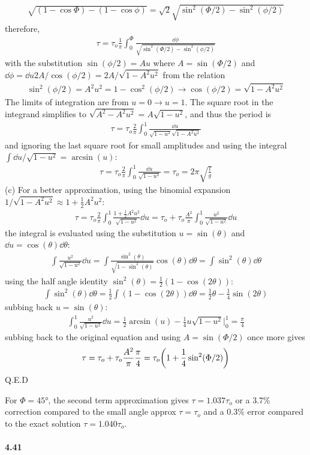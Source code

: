 \documentclass[../problems.tex]{subfiles}
\begin{document}
\begin{align*}
    \sqrt{(1-\cos\Phi) - (1-\cos\phi)} = \sqrt{2} \sqrt{\sin^2(\Phi/2) - \sin^2(\phi/2)}
\end{align*}
therefore,
\begin{align*}
    \tau = \tau_o \frac{1}{\pi} \int_0^\Phi \frac{\dd{\phi}}{\sqrt{\sin^2(\Phi/2) - \sin^2(\phi/2)}}
\end{align*}
with the substitution $\sin(\phi/2) = Au$ where $A = \sin(\Phi/2)$ and
$\dd{\phi} = \dd{u} 2A/\cos(\phi/2) = 2A/\sqrt{1-A^2 u^2}$ from the relation
\begin{align*}
    \sin^2(\phi/2) = A^2 u^2 = 1 - \cos^2(\phi/2) \to \cos(\phi/2) = \sqrt{1 - A^2 u^2}
\end{align*}
The limits of integration are from $u = 0 \to u = 1$. The square root in the integrand simplifies to
$\sqrt{A^2 - A^2u^2} = A\sqrt{1 - u^2}$, and thus the period is
\begin{align*}
    \tau = \tau_o \frac{2}{\pi} \int_0^1 \frac{\dd{u}}{\sqrt{1-u^2} \sqrt{1-A^2 u^2}}
\end{align*}
and ignoring the last square root for small amplitudes and using the integral
$\int \dd{u}/\sqrt{1-u^2} = \arcsin(u)$:
\begin{align*}
    \tau = \tau_o \frac{2}{\pi} \int_0^1 \frac{\dd{u}}{\sqrt{1-u^2}}
    = \tau_o = 2\pi \sqrt{\frac{l}{g}}
\end{align*}
(c) For a better approximation, using the binomial expansion $1/\sqrt{1-A^2 u^2} \approx
1 + \frac{1}{2} A^2 u^2$:
\begin{align*}
    \tau = \tau_o \frac{2}{\pi} \int_0^1 \frac{1 + \frac{1}{2} A^2 u^2}{\sqrt{1-u^2}} \dd{u}
    = \tau_o + \tau_o \frac{A^2}{\pi} \int_0^1 \frac{u^2}{\sqrt{1-u^2}} \dd{u}
\end{align*}
the integral is evaluated using the substitution $u = \sin(\theta)$ and $\dd{u} = \cos(\theta)
\dd{\theta}$:
\begin{align*}
    \int \frac{u^2}{\sqrt{1-u^2}} \dd{u} = \int \frac{\sin^2(\theta)}{\sqrt{1-\sin^2(\theta)}}
        \cos(\theta) \dd{\theta}
    = \int \sin^2(\theta) \dd{\theta}
\end{align*}
using the half angle identity $\sin^2(\theta) = \frac{1}{2}(1 - \cos(2\theta))$:
\begin{align*}
    \int \sin^2(\theta) \dd{\theta} = \frac{1}{2} \int (1 - \cos(2\theta)) \dd{\theta}
    = \frac{1}{2} \theta - \frac{1}{4} \sin(2\theta)
\end{align*}
subbing back $u = \sin(\theta)$:
\begin{align*}
    \int_0^1 \frac{u^2}{\sqrt{1-u^2}} \dd{u}
    = \frac{1}{2} \arcsin(u) - \frac{1}{4} u \sqrt{1-u^2} \Big|_0^1 = \frac{\pi}{4}
\end{align*}
subbing back to the original equation and using $A = \sin(\Phi/2)$ once more gives
\begin{align*}
    \tau = \tau_o + \tau_o \frac{A^2}{\pi} \frac{\pi}{4} 
    = \tau_o \quantity(1 + \frac{1}{4} \sin^2(\Phi/2))
\end{align*}
Q.E.D

For $\Phi = \ang{45}$, the second term approximation gives $\tau = 1.037\tau_o$ or a 3.7\%
correction compared to the small angle approx $\tau = \tau_o$ and a 0.3\% error compared to the
exact solution $\tau = 1.040\tau_o$.

\paragraph{4.41}
\end{document}
